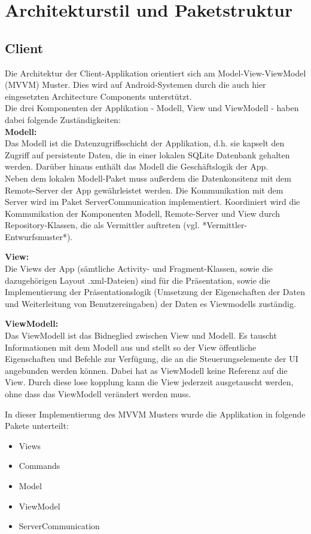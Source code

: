 \documentclass[parskip=full]{scrartcl}
\begin{document}
\newpage

\section{Architekturstil und Paketstruktur}

\subsection{Client}
Die Architektur der Client-Applikation orientiert sich am Model-View-ViewModel (MVVM) Muster. Dies wird auf Android-Systemen durch die auch hier eingesetzten Architecture Components unterstützt. \\

Die drei Komponenten der Applikation - Modell, View und ViewModell - haben dabei folgende Zuständigkeiten:\\

\textbf{Modell:}\\
Das Modell ist die Datenzugriffsschicht der Applikation, d.h. sie kapselt den Zugriff auf persistente Daten, die in einer lokalen SQLite Datenbank gehalten werden. Darüber hinaus enthält das Modell die Geschäftslogik der App.\\
Neben dem lokalen Modell-Paket muss außerdem die Datenkonsitenz mit dem Remote-Server der App gewährleistet werden. Die Kommunikation mit dem Server wird im Paket ServerCommunication implementiert. Koordiniert wird die Kommunikation der Komponenten Modell, Remote-Server und View durch Repository-Klassen, die als Vermittler auftreten (vgl. *Vermittler-Entwurfsmuster*).

\textbf{View:}\\
Die Views der App (sämtliche Activity- und Fragment-Klassen, sowie die dazugehörigen Layout .xml-Dateien) sind für die Präsentation, sowie die Implementierung der Präsentationslogik (Umsetzung der Eigenschaften der Daten und Weiterleitung von Benutzereingaben) der Daten es Viewmodells zuständig.

\textbf{ViewModell:}\\
Das ViewModell ist das Bidneglied zwischen View und Modell. Es tauscht Informationen mit dem Modell aus und stellt so der View öffentliche Eigenschaften und Befehle zur Verfügung, die an die Steuerungselemente der UI angebunden werden können. Dabei hat as ViewModell keine Referenz auf die View. Durch diese lose kopplung kann die View jederzeit ausgetauscht werden, ohne dass das ViewModell verändert werden muss.

In dieser Implementierung des MVVM Musters wurde die Applikation in folgende Pakete unterteilt:
\begin{itemize}
	\item Views
	\item Commands
	\item Model
	\item ViewModel
	\item ServerCommunication
\end{itemize}
\end{document}
